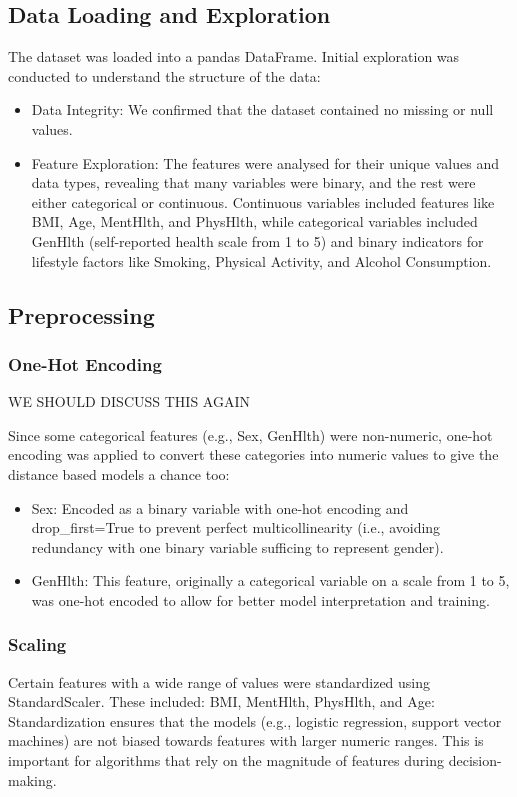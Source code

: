 \documentclass[a4paper,12pt]{article}
\begin{document}
\subsection{Data Loading and Exploration}
The dataset was loaded into a pandas DataFrame. Initial exploration was conducted to understand 
the structure of the data:
\begin{itemize}
    \item Data Integrity: We confirmed that the dataset contained no missing or null values.
    \item Feature Exploration: The features were analysed for their unique values and data 
    types, revealing that many variables were binary, and the rest were either categorical or 
    continuous. Continuous variables included features like BMI, Age, MentHlth, and PhysHlth, 
    while categorical variables included GenHlth (self-reported health scale from 1 to 5) 
    and binary indicators for lifestyle factors like Smoking, Physical Activity, and Alcohol 
    Consumption.
\end{itemize}

\subsection{Preprocessing}
\subsubsection{One-Hot Encoding}
WE SHOULD DISCUSS THIS AGAIN

Since some categorical features (e.g., Sex, GenHlth) were non-numeric, one-hot encoding was 
applied to convert these categories into numeric values to give the distance based models a chance too:
\begin{itemize}
    \item Sex: Encoded as a binary variable with one-hot encoding and drop\_first=True to prevent
    perfect multicollinearity (i.e., avoiding redundancy with one binary variable sufficing to 
    represent gender).
    \item GenHlth: This feature, originally a categorical variable on a scale from 1 to 5, 
    was one-hot encoded to allow for better model interpretation and training.
\end{itemize}

\subsubsection{Scaling}
Certain features with a wide range of values were standardized using StandardScaler. These included:
BMI, MentHlth, PhysHlth, and Age: Standardization ensures that the models 
(e.g., logistic regression, support vector machines) are not biased towards features with larger 
numeric ranges. This is important for algorithms that rely on the magnitude of features during 
decision-making.
\end{document}

